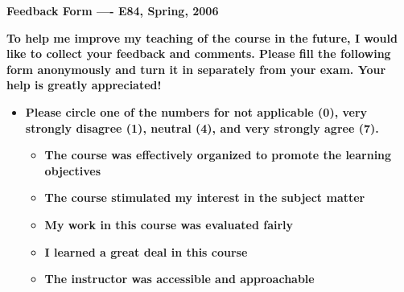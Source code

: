\usepackage{html}

\begin{center}
{\Large \bf  Feedback Form ---- E84, Spring, 2006}
\end{center}

{\bf  To help me improve my teaching of the course in the future, I would 
like to collect your feedback and comments. Please fill the following form 
{\bf anonymously} and turn it in {\bf separately} from your exam. Your 
help is greatly appreciated!}

\begin{itemize}
\item {\bf Please circle one of the numbers for not applicable (0), very strongly
  disagree (1), neutral (4), and very strongly agree (7).}
\begin{itemize}

\item {\bf The course was effectively organized to promote the learning objectives}


\item {\bf The course stimulated my interest in the subject matter}


\item {\bf My work in this course was evaluated fairly}


\item {\bf I learned a great deal in this course}


\item {\bf The instructor was accessible and approachable}



\end{itemize}
\end{itemize}
